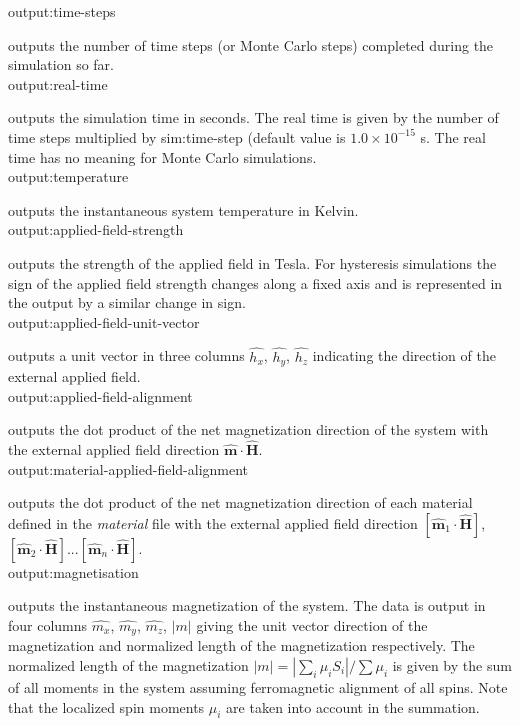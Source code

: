 {\zicf output:time-steps} outputs the number of time steps (or Monte Carlo steps) completed during the simulation so far.\\

{\zicf output:real-time} outputs the simulation time in seconds. The real time is given by the number of time steps multiplied by sim:time-step (default value is $1.0 \times 10^{-15}$ s. The real time has no meaning for Monte Carlo simulations.\\

{\zicf output:temperature} outputs the instantaneous system temperature in Kelvin.\\

{\zicf output:applied-field-strength} outputs the strength of the applied field in Tesla. For hysteresis simulations the sign of the applied field strength changes along a fixed axis and is represented in the output by a similar change in sign.\\

{\zicf output:applied-field-unit-vector} outputs a unit vector in three columns $\hat{h_x}$, $\hat{h_y}$, $\hat{h_z}$ indicating the direction of the external applied field.\\

{\zicf output:applied-field-alignment} outputs the dot product of the net magnetization direction of the system with the external applied field direction $\hat{\mathbf{m}} \cdot \hat{\mathbf{H}}$.\\

{\zicf output:material-applied-field-alignment} outputs the dot product of the net magnetization direction of each material defined in the \textit{material} file with the external applied field direction $\left[\hat{\mathbf{m}}_1 \cdot \hat{\mathbf{H}}\right]$, $\left[\hat{\mathbf{m}}_2 \cdot \hat{\mathbf{H}}\right]$...$\left[\hat{\mathbf{m}}_n \cdot \hat{\mathbf{H}}\right]$.\\

{\zicf output:magnetisation} outputs the instantaneous magnetization of the system. The data is output in four columns $\hat{m_x}$, $\hat{m_y}$, $\hat{m_z}$, $|m|$ giving the unit vector direction of the magnetization and normalized length of the magnetization respectively. The normalized length of the magnetization $|m| = |\sum_i \mu_i S_i| / \sum \mu_i$ is given by the sum of all moments in the system assuming ferromagnetic alignment of all spins. Note that the localized spin moments $\mu_i$ are taken into account in the summation.\\


